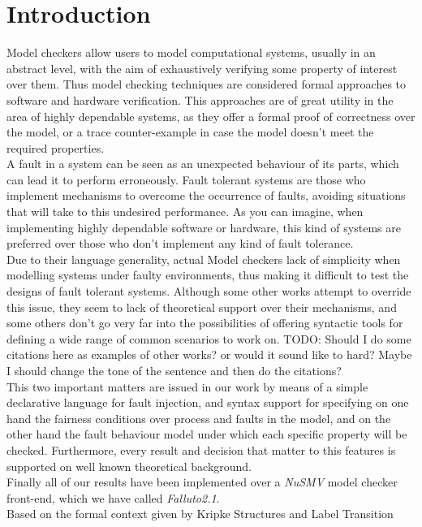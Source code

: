 \documentclass[12pt]{article}
\newcommand{\todo}[1]{{\color{red}TODO: #1}}
\begin{document}
\section{Introduction}
Model checkers allow users to model computational systems, usually in an
abstract level, with the aim of exhaustively verifying some property of
interest over them. Thus model checking techniques are considered formal
approaches to software and hardware verification. This approaches are of great
utility in the area of highly dependable systems, as they offer a formal proof
of correctness over the model, or a trace counter-example in case the model
doesn't meet the required properties.\\
A fault in a system can be seen as an unexpected behaviour of its parts, which
can lead it to perform erroneously. Fault tolerant systems are those who
implement mechanisms to overcome the occurrence of faults, avoiding situations
that will take to this undesired performance. As you can imagine, when
implementing highly dependable software or hardware, this kind of systems are
preferred over those who don't implement any kind of fault tolerance.\\
Due to their language generality, actual Model checkers lack of simplicity when
modelling systems under faulty environments, thus making it difficult to test
the designs of fault tolerant systems. Although some other works attempt to
override this issue, they seem to lack of theoretical support over their
mechanisms, and some others don't go very far into the possibilities
of offering syntactic tools for defining a wide range of common scenarios to
work on. \todo{Should I do some citations here as examples of other works?
or would it sound like to hard? Maybe I should change the tone of the sentence
and then do the citations?}\\ 
This two important matters are issued in our work by means of a simple
declarative language for fault injection, and syntax support for specifying
on one hand the fairness conditions over process and faults in the model, and 
on the other hand the fault behaviour model under which each specific property
will be checked. Furthermore, every result and decision that matter to this
features is supported on well known theoretical background.\\
Finally all of our results have been implemented over a
\mbox{\textit{NuSMV}}\cite{cimatti} model checker front-end, which we have called
\mbox{\textit{Falluto2.1}}.\\
Based on the formal context given by Kripke Structures and Label Transition 
\end{document}
